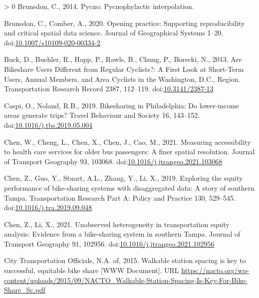 \documentclass[]{elsarticle} %
\newlength{\cslhangindent}
\newenvironment{CSLReferences}[3] %
 {%
  \setlength{\parindent}{0pt}
  \ifodd #1 \everypar{\setlength{\hangindent}{\cslhangindent}}\ignorespaces\fi
  \ifnum #2 > 0
  \setlength{\parskip}{#2\baselineskip}
  \fi
 }%
 {}
\begin{document}
\begin{CSLReferences}{1}{0}
\leavevmode\hypertarget{ref-R-pycno}{}%
Brunsdon, C., 2014. Pycno: Pycnophylactic interpolation.

\leavevmode\hypertarget{ref-brunsdon2020opening}{}%
Brunsdon, C., Comber, A., 2020. Opening practice: Supporting
reproducibility and critical spatial data science. Journal of
Geographical Systems 1--20.
doi:\href{https://doi.org/10.1007/s10109-020-00334-2}{10.1007/s10109-020-00334-2}

\leavevmode\hypertarget{ref-buckAreBikeshareUsers2013}{}%
Buck, D., Buehler, R., Happ, P., Rawls, B., Chung, P., Borecki, N.,
2013. Are {Bikeshare Users Different} from {Regular Cyclists}?: {A First
Look} at {Short}-{Term Users}, {Annual Members}, and {Area Cyclists} in
the {Washington}, {D}.{C}., {Region}. Transportation Research Record
2387, 112--119.
doi:\href{https://doi.org/10.3141/2387-13}{10.3141/2387-13}

\leavevmode\hypertarget{ref-caspiBikesharingPhiladelphiaLowerincome2019}{}%
Caspi, O., Noland, R.B., 2019. Bikesharing in {Philadelphia}: {Do}
lower-income areas generate trips? Travel Behaviour and Society 16,
143--152.
doi:\href{https://doi.org/10.1016/j.tbs.2019.05.004}{10.1016/j.tbs.2019.05.004}

\leavevmode\hypertarget{ref-chenMeasuringAccessibilityHealth2021}{}%
Chen, W., Cheng, L., Chen, X., Chen, J., Cao, M., 2021. Measuring
accessibility to health care services for older bus passengers: {A}
finer spatial resolution. Journal of Transport Geography 93, 103068.
doi:\href{https://doi.org/10.1016/j.jtrangeo.2021.103068}{10.1016/j.jtrangeo.2021.103068}

\leavevmode\hypertarget{ref-chenExploringEquityPerformance2019}{}%
Chen, Z., Guo, Y., Stuart, A.L., Zhang, Y., Li, X., 2019. Exploring the
equity performance of bike-sharing systems with disaggregated data: {A}
story of southern {Tampa}. Transportation Research Part A: Policy and
Practice 130, 529--545.
doi:\href{https://doi.org/10.1016/j.tra.2019.09.048}{10.1016/j.tra.2019.09.048}

\leavevmode\hypertarget{ref-chenUnobservedHeterogeneityTransportation2021}{}%
Chen, Z., Li, X., 2021. Unobserved heterogeneity in transportation
equity analysis: {Evidence} from a bike-sharing system in southern
{Tampa}. Journal of Transport Geography 91, 102956.
doi:\href{https://doi.org/10.1016/j.jtrangeo.2021.102956}{10.1016/j.jtrangeo.2021.102956}

\leavevmode\hypertarget{ref-nactowalkingstation2015}{}%
City Transportation Officials, N.A. of, 2015. Walkable station spacing
is key to successful, equitable bike share {[}WWW Document{]}. URL
\url{https://nacto.org/wp-content/uploads/2015/09/NACTO_Walkable-Station-Spacing-Is-Key-For-Bike-Share_Sc.pdf}


\end{CSLReferences}
\end{document}
